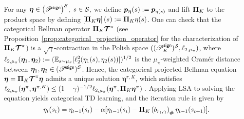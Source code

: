 For any ${\bm{\eta}}\in\left({{\mathscr{P}}^{\mathsf{sign}}}\right)^{\mathcal{S}}$, $s\in{\mathcal{S}}$, we define ${\bm{p}}_{\bm{\eta}}(s):={\bm{p}}_{\eta(s)}$ and lift ${\bm{\Pi}}_K$ to the product space by defining
$\left[{\bm{\Pi}_K{\bm{\eta}}}\right](s) := \bm{\Pi}_K\eta(s)$.
One can check that the categorical Bellman operator ${\bm{\Pi}}_{K}{\bm{\mathcal{T}}}^{\pi}$ (see Proposition~\ref{prop:categorical_projection_operator} for the characterization of $\bm{\Pi}_K\bm{\mathcal{T}}^\pi$) is a $\sqrt\gamma$-contraction in the Polish space $(({\mathscr{P}}_K^{\mathsf{sign}})^{\mathcal{S}},\ell_{2,\mu_\pi})$, where $\ell_{2,\mu_\pi}(\bm{\eta}_1,\bm{\eta}_2):=({\mathbb E}_{s\sim\mu_{\pi}}[\ell_2^2(\eta_1(s),\eta_2(s))])^{1/2}$ is the $\mu_\pi$-weighted Cram\'er distance between $\bm{\eta}_1,\bm{\eta}_2\in({\mathscr{P}}^{\mathsf{sign}})^{\mathcal{S}}$.
Hence, the categorical projected Bellman equation $\bm{\eta}={\bm{\Pi}}_{K}\bm{\mathcal{T}}^{\pi}\bm{\eta}$ admits a unique solution $\bm{\eta}^{\pi,K}$, which satisfies $\ell_{2,\mu_\pi}(\bm{\eta}^\pi,\bm{\eta}^{\pi,K})\leq(1-\gamma)^{-1/2}\ell_{2,\mu_\pi}(\bm{\eta}^\pi,{\bm{\Pi}}_K\bm{\eta}^{\pi})$ \citep[Proposition~3][]{rowland2018analysis}.
Applying LSA to solving the equation yields categorical TD learning, and the iteration rule is given by
\begin{equation*}
    \eta_{t}(s_t)=\eta_{t-1}(s_{t})-\alpha[\eta_{t-1}(s_{t})-{\bm{\Pi}}_K\left({b_{r_t,\gamma}}\right)_\#\eta_{t-1}(s_{t+1})].
\end{equation*}

